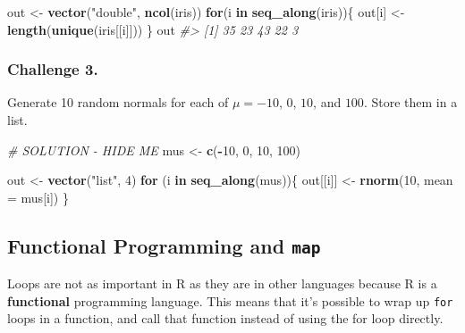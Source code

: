 \documentclass[]{book}
\newenvironment{Shaded}{\begin{snugshade}}{\end{snugshade}}
\newcommand{\CommentTok}[1]{\textcolor[rgb]{0.56,0.35,0.01}{\textit{#1}}}
\newcommand{\ControlFlowTok}[1]{\textcolor[rgb]{0.13,0.29,0.53}{\textbf{#1}}}
\newcommand{\DataTypeTok}[1]{\textcolor[rgb]{0.13,0.29,0.53}{#1}}
\newcommand{\DecValTok}[1]{\textcolor[rgb]{0.00,0.00,0.81}{#1}}
\newcommand{\KeywordTok}[1]{\textcolor[rgb]{0.13,0.29,0.53}{\textbf{#1}}}
\newcommand{\NormalTok}[1]{#1}
\newcommand{\OperatorTok}[1]{\textcolor[rgb]{0.81,0.36,0.00}{\textbf{#1}}}
\newcommand{\StringTok}[1]{\textcolor[rgb]{0.31,0.60,0.02}{#1}}
\begin{document}
\begin{Shaded}
\begin{Highlighting}[]
\NormalTok{out <-}\StringTok{ }\KeywordTok{vector}\NormalTok{(}\StringTok{"double"}\NormalTok{, }\KeywordTok{ncol}\NormalTok{(iris))}
\ControlFlowTok{for}\NormalTok{(i }\ControlFlowTok{in} \KeywordTok{seq_along}\NormalTok{(iris))\{}
\NormalTok{  out[i] <-}\StringTok{ }\KeywordTok{length}\NormalTok{(}\KeywordTok{unique}\NormalTok{(iris[[i]]))}
\NormalTok{\}}
\NormalTok{out}
\CommentTok{#> [1] 35 23 43 22  3}
\end{Highlighting}
\end{Shaded}

\hypertarget{challenge-3.-8}{%
\subsubsection*{Challenge 3.}\label{challenge-3.-8}}

Generate 10 random normals for each of \(\mu = -10\), \(0\), \(10\), and \(100\). Store them in a list.

\begin{Shaded}
\begin{Highlighting}[]
\CommentTok{# SOLUTION - HIDE ME}
\NormalTok{mus <-}\StringTok{ }\KeywordTok{c}\NormalTok{(}\OperatorTok{-}\DecValTok{10}\NormalTok{, }\DecValTok{0}\NormalTok{, }\DecValTok{10}\NormalTok{, }\DecValTok{100}\NormalTok{)}

\NormalTok{out <-}\StringTok{ }\KeywordTok{vector}\NormalTok{(}\StringTok{"list"}\NormalTok{, }\DecValTok{4}\NormalTok{)}
\ControlFlowTok{for}\NormalTok{ (i }\ControlFlowTok{in} \KeywordTok{seq_along}\NormalTok{(mus))\{}
\NormalTok{  out[[i]] <-}\StringTok{ }\KeywordTok{rnorm}\NormalTok{(}\DecValTok{10}\NormalTok{, }\DataTypeTok{mean =}\NormalTok{ mus[i])}
\NormalTok{\}}
\end{Highlighting}
\end{Shaded}

\hypertarget{functional-programming-and-map}{%
\subsection{\texorpdfstring{Functional Programming and \texttt{map}}{Functional Programming and map}}\label{functional-programming-and-map}}

Loops are not as important in R as they are in other languages because R is a \textbf{functional} programming language. This means that it's possible to wrap up \texttt{for} loops in a function, and call that function instead of using the for loop directly.
\end{document}
